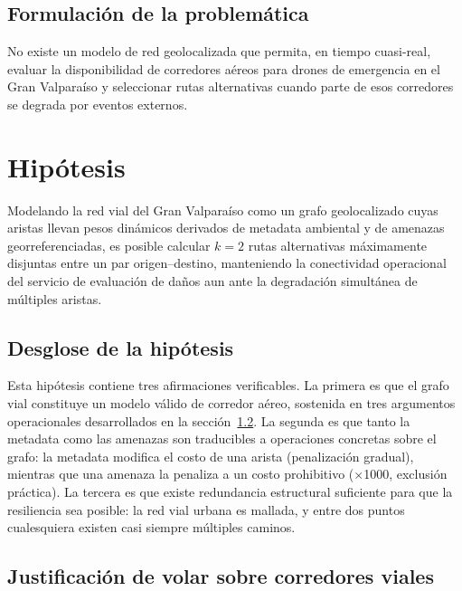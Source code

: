 \documentclass[conference]{IEEEtran}
\begin{document}
\subsection{Formulación de la problemática}

No existe un modelo de red geolocalizada que permita, en tiempo cuasi-real, evaluar la disponibilidad de corredores aéreos para drones de emergencia en el Gran Valparaíso y seleccionar rutas alternativas cuando parte de esos corredores se degrada por eventos externos.


\section{Hipótesis}

Modelando la red vial del Gran Valparaíso como un grafo geolocalizado cuyas aristas llevan pesos dinámicos derivados de metadata ambiental y de amenazas georreferenciadas, es posible calcular $k=2$ rutas alternativas máximamente disjuntas entre un par origen--destino, manteniendo la conectividad operacional del servicio de evaluación de daños aun ante la degradación simultánea de múltiples aristas.


\subsection{Desglose de la hipótesis}

Esta hipótesis contiene tres afirmaciones verificables. La primera es que el grafo vial constituye un modelo válido de corredor aéreo, sostenida en tres argumentos operacionales desarrollados en la sección~\ref{sec:justificacion}. La segunda es que tanto la metadata como las amenazas son traducibles a operaciones concretas sobre el grafo: la metadata modifica el costo de una arista (penalización gradual), mientras que una amenaza la penaliza a un costo prohibitivo ($\times$1000, exclusión práctica). La tercera es que existe redundancia estructural suficiente para que la resiliencia sea posible: la red vial urbana es mallada, y entre dos puntos cualesquiera existen casi siempre múltiples caminos.

\subsection{Justificación de volar sobre corredores viales}
\label{sec:justificacion}
\end{document}
